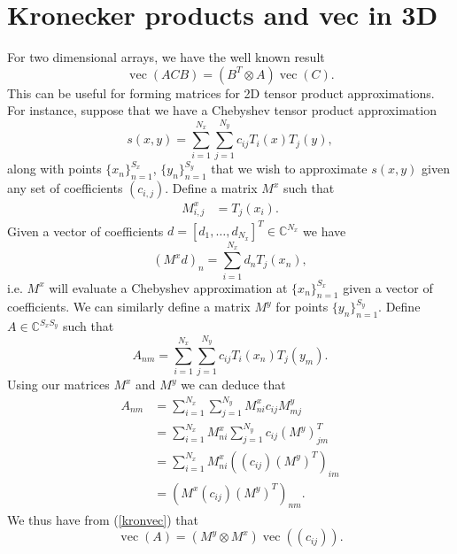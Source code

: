 \documentclass{article}
\newcommand{\C}{\mathbb{C}}
\DeclareMathOperator{\vecm}{vec}
\begin{document}
\section{Kronecker products and vec in 3D}
For two dimensional arrays, we have the well known result
\begin{equation}
\vecm(ACB) = (B^T \otimes A) \vecm (C).
\label{kronvec}
\end{equation}
This can be useful for forming matrices for 2D tensor product approximations. For instance, suppose that we have a Chebyshev tensor product approximation
\begin{equation}
s(x,y) = \sum_{i=1}^{N_x} \sum_{j=1}^{N_y} c_{ij} T_i(x)T_j(y),
\end{equation}
along with points $\{x_n\}_{n=1}^{S_x}$, $\{y_n\}_{n=1}^{S_y}$ that we wish to approximate $s(x,y)$ given any set of coefficients $(c_{i,j})$. Define a matrix $M^x$ such that
\begin{equation}
\begin{aligned}
	M_{i,j}^x &= T_j(x_i).
\end{aligned}
\end{equation}
Given a vector of coefficients $d = [d_1,\dots,d_{N_x}]^T \in \C^{N_x}$ we have
\begin{equation}
(M^x d)_n = \sum_{i=1}^{N_x} d_n T_j(x_n),
\end{equation}
i.e. $M^x$ will evaluate a Chebyshev approximation at $\{x_n\}_{n=1}^{S_x}$ given a vector of coefficients. We can similarly define a matrix $M^y$ for points $\{y_n\}_{n=1}^{S_y}$. Define $A \in \C^{S_x S_y}$ such that
\begin{equation}
A_{nm} = \sum_{i=1}^{N_x} \sum_{j=1}^{N_y} c_{ij} T_i(x_n)T_j(y_m).
\end{equation}
Using our matrices $M^x$ and $M^y$ we can deduce that
\begin{equation}
\begin{aligned}
A_{nm} &= \sum_{i=1}^{N_x} \sum_{j=1}^{N_y} M_{ni}^x c_{ij} M_{mj}^y \\
       &= \sum_{i=1}^{N_x} M_{ni}^x \sum_{j=1}^{N_y} c_{ij} (M^y)_{jm}^T \\
       &= \sum_{i=1}^{N_x} M_{ni}^x ((c_{ij}) (M^y)^T)_{im} \\
       &=  (M^x(c_{ij}) (M^y)^T)_{nm}.
\end{aligned}
\end{equation}
We thus have from (\ref{kronvec}) that
\begin{equation}
	\vecm(A) = (M^y \otimes M^x) \vecm((c_{ij})).
	\label{2DKron}
\end{equation}
\end{document}
